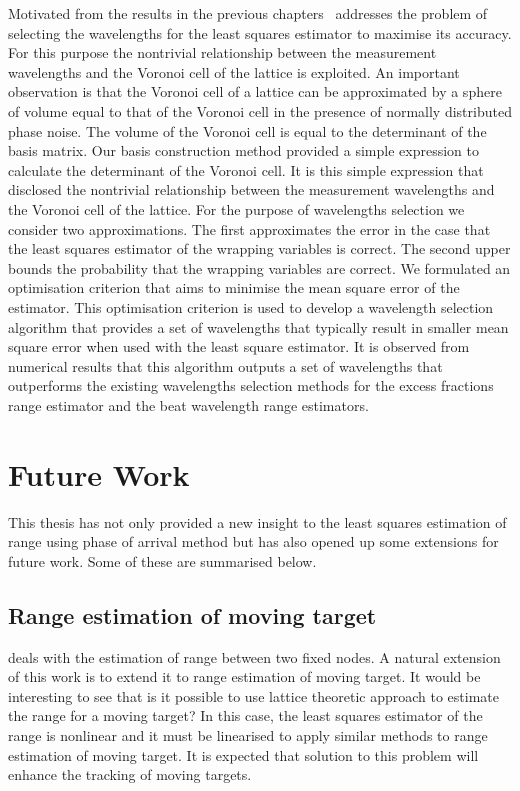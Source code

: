 Motivated from the results in the previous chapters~ addresses the problem of selecting the wavelengths for the least squares estimator to maximise its accuracy. For this purpose the nontrivial relationship between the measurement wavelengths and the Voronoi cell of the lattice is exploited.  An important observation is that the Voronoi cell of a lattice can be approximated by a sphere of volume equal to that of the Voronoi cell in the presence of normally distributed phase noise. The volume of the Voronoi cell is equal to the determinant of the basis matrix. Our basis construction method provided a simple expression to calculate the determinant of the Voronoi cell. It is this simple expression that disclosed the nontrivial relationship between the measurement wavelengths and the Voronoi cell of the lattice. For the purpose of wavelengths selection we consider two approximations. The first approximates the error in the case that the least squares estimator of the wrapping variables is correct. The second upper bounds the probability that the wrapping variables are correct. We formulated an optimisation criterion that aims to minimise the mean square error of the estimator. This optimisation criterion is used to develop a wavelength selection algorithm that provides a set of wavelengths that typically result in smaller mean square error when used with the least square estimator. It is observed from numerical results that this algorithm outputs a set of wavelengths that outperforms the existing wavelengths selection methods for the excess fractions range estimator and the beat wavelength range estimators.

\section{Future Work}
This thesis has not only provided a new insight to the least squares estimation of range using phase of arrival method but has also opened up some extensions for future work. Some of these are summarised below.

\subsection*{Range estimation of moving target}
 deals with the estimation of range between two fixed nodes. A natural extension of this work is to extend it to range estimation of moving target. It would be interesting to see that is it possible to use lattice theoretic approach to estimate the range for a moving target? In this case, the least squares estimator of the range is nonlinear and it must be linearised to apply similar methods to range estimation of moving target. It is expected that solution to this problem will enhance the tracking of moving targets.


